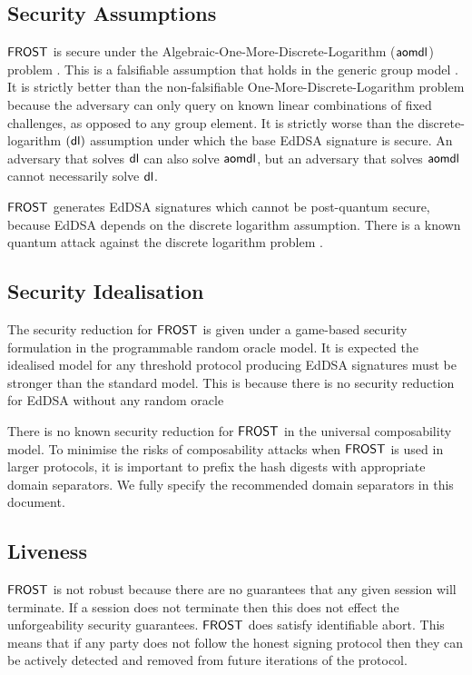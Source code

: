 \subsection{Security Assumptions}\label{section:comparisons:security}
$\mathsf{FROST}$ is secure under the Algebraic-One-More-Discrete-Logarithm ($\mathsf{aomdl}$) problem \cite{NickRS21}.
This is a falsifiable assumption that holds in the generic group model \cite{CorettiDG18,BauerFP21}.
It is strictly better than the non-falsifiable One-More-Discrete-Logarithm problem \cite{BellareNPS03} because the adversary can only query on known linear combinations of fixed challenges,
as opposed to any group element.
It is strictly worse than the discrete-logarithm $(\mathsf{dl})$ assumption under which the base EdDSA signature is secure.
An adversary that solves $\mathsf{dl}$ can also solve $\mathsf{aomdl}$, but an adversary that solves $\mathsf{aomdl}$ cannot necessarily solve $\mathsf{dl}$.

$\mathsf{FROST}$ generates EdDSA signatures which cannot be post-quantum secure, because EdDSA depends on the discrete logarithm assumption.
There is a known quantum attack against the discrete logarithm problem \cite{Shor99}.



\subsection{Security Idealisation}\label{section:comparisons:idealisation}
The security reduction for $\mathsf{FROST}$ is given under a game-based security formulation in the programmable random oracle model.
It is expected the idealised model for any threshold protocol producing EdDSA signatures must be stronger than the standard model.
This is because there is no security reduction for EdDSA without any random oracle~\cite{PaillierV05,FischlinF13,FleischhackerJS14}

There is no known security reduction for $\mathsf{FROST}$ in the universal composability model.
To minimise the risks of composability attacks when $\mathsf{FROST}$ is used in larger protocols,
it is important to prefix the hash digests with appropriate domain separators.
We fully specify the recommended domain separators in this document.

\subsection{Liveness}
$\mathsf{FROST}$ is not  robust because there are no guarantees that any given session will terminate.
If a session does not terminate then this does not effect the unforgeability security guarantees.
$\mathsf{FROST}$ does satisfy identifiable abort.  This means that if any party does not follow the honest signing protocol then they can be actively detected and removed from future iterations of the protocol.


